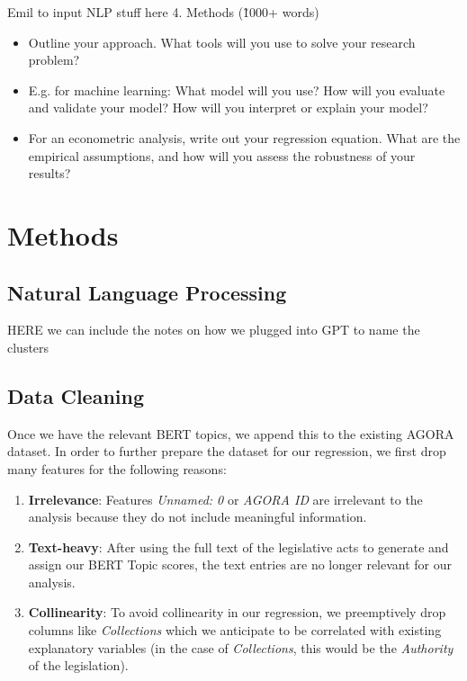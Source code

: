 \documentclass{article}
\begin{document}
Emil to input NLP stuff here
4. Methods (\~1000+ words)

\begin{itemize}
    \item Outline your approach. What tools will you use to solve your research problem?
    \item E.g. for machine learning: What model will you use? How will you evaluate and validate your model? How will you interpret or explain your model? 
    \item For an econometric analysis, write out your regression equation. What are the empirical assumptions, and how will you assess the robustness of your results?
\end{itemize}
\section{Methods}
\subsection{Natural Language Processing}
HERE we can include the notes on how we plugged into GPT to name the clusters
\subsection{Data Cleaning}

Once we have the relevant BERT topics, we append this to the existing AGORA dataset. In order to further prepare the dataset for our regression, we first drop many features for the following reasons: 
\begin{adjustwidth}{2em}{0em}
\begin{enumerate}
    \item \textbf{Irrelevance}: Features \textit{Unnamed: 0} or \textit{AGORA ID} are irrelevant to the analysis because they do not include meaningful information.
    \item \textbf{Text-heavy}: After using the full text of the legislative acts to generate and assign our BERT Topic scores, the text entries are no longer relevant for our analysis.
    \item \textbf{Collinearity}: To avoid collinearity in our regression, we preemptively drop columns like \textit{Collections} which we anticipate to be correlated with existing explanatory variables (in the case of \textit{Collections}, this would be the \textit{Authority} of the legislation).
\end{enumerate}
\end{adjustwidth}
\end{document}
